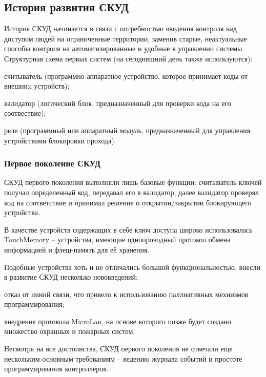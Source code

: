 \subsection{История развития СКУД}

История СКУД начинается в связи с потребностью введения контроля над доступом людей на ограниченные территории, заменив старые, неактуальные способы контроля на автоматизированные и удобные в управлении системы. Структурная схема первых систем (на сегодняшний день также используются):

\begin{itemize*}
\item считыватель (программно-аппаратное устройство, которое принимает коды от внешниx устройств);
\item валидатор (логический блок, предназначенный для проверки кода на его соотвествие);
\item реле (программный или аппаратный модуль, предназначенный для управления устройствами блокировки прохода).
\end{itemize*}

\subsubsection{Первое поколение СКУД}

СКУД первого поколения выполняли лишь базовые функции: считыватель ключей получал определенный код, передавал его в валидатор, далее валидатор проверял код на соответствие и принимал решение о открытии/закрытии блокирующего устройства.


В качестве устройств содержащих в себе ключ доступа широко использовалась TouchMemory -- устройства, имеющие однопроводный протокол обмена информацией и флеш-память для её хранения.


Подобные устройства хоть и не отличались большой функциональностью, внесли в развитие СКУД несколько нововведений:

\begin{itemize*}
\item отказ от линий связи, что привело к использованию паллиативных мехнизмов программирования;
\item внедрение протокола MicroLan, на основе которого позже будет создано множество охранных и пожарных систем.
\end{itemize*}

Несмотря на все достоинства, СКУД первого поколения не отвечали еще нескольким основным требованиям -- ведению журнала событий и простоте программирования контроллеров.
